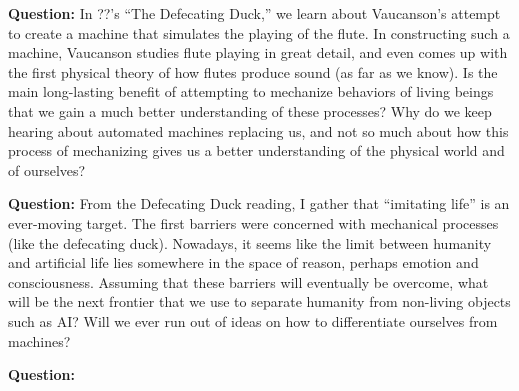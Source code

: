 \textbf{Question:}
In ??'s ``The Defecating Duck,'' we learn about Vaucanson's attempt to create a machine that simulates the playing of the flute.
In constructing such a machine, Vaucanson studies flute playing in great detail, and even comes up with the first physical theory of how flutes produce sound (as far as we know).
Is the main long-lasting benefit of attempting to mechanize behaviors of living beings that we gain a much better understanding of these processes?
Why do we keep hearing about automated machines replacing us, and not so much about how this process of mechanizing gives us a better understanding of the physical world and of ourselves?


\textbf{Question:}
From the Defecating Duck reading, I gather that ``imitating life'' is an ever-moving target.
The first barriers were concerned with mechanical processes (like the defecating duck).
Nowadays, it seems like the limit between humanity and artificial life lies somewhere in the space of reason, perhaps emotion and consciousness.
Assuming that these barriers will eventually be overcome, what will be the next frontier that we use to separate humanity from non-living objects such as AI?
Will we ever run out of ideas on how to differentiate ourselves from machines?

\textbf{Question:}
